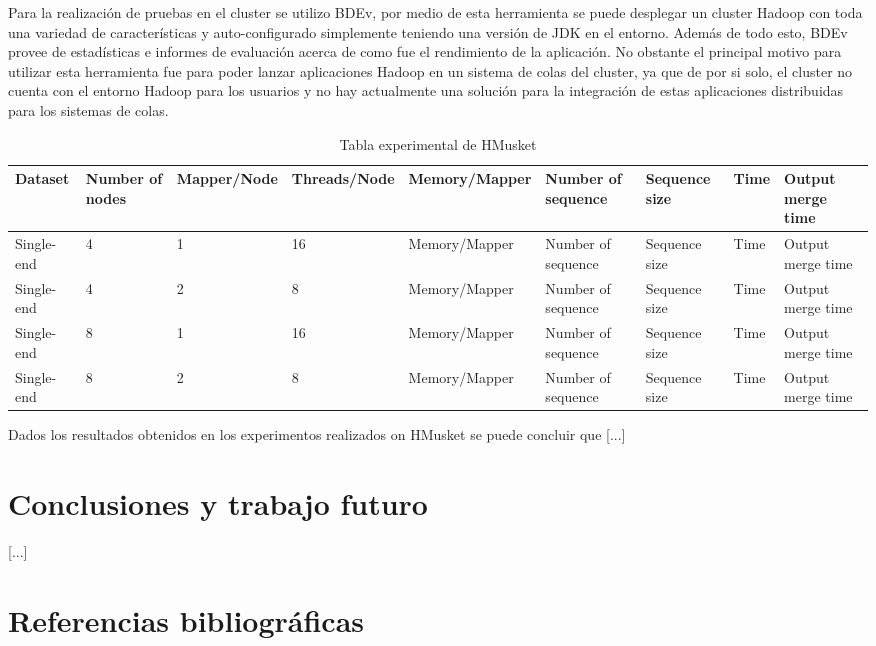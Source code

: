 \documentclass[conference]{IEEEtran}
\begin{document}
Para la realización de pruebas en el cluster se utilizo BDEv, por medio de esta herramienta se puede desplegar un cluster Hadoop con toda una variedad de características y auto-configurado simplemente teniendo una versión de JDK en el entorno. Además de todo esto, BDEv provee de estadísticas e informes de evaluación acerca de como fue el rendimiento de la aplicación. No obstante el principal motivo para utilizar esta herramienta fue para poder lanzar aplicaciones Hadoop en un sistema de colas del cluster, ya que de por si solo, el cluster no cuenta con el entorno Hadoop para los usuarios y no hay actualmente una solución para la integración de estas aplicaciones distribuidas para los sistemas de colas.\\

\begin{table}[]
	\centering
	\caption{Tabla experimental de HMusket}
	\label{tabla 1}
	\begin{tabular}{|l|l|l|l|l|l|l|l|l|}
		\hline
		\textbf{Dataset} &	\textbf{Number of nodes} & \textbf{Mapper/Node} & \textbf{Threads/Node} & \textbf{Memory/Mapper} & \textbf{Number of sequenc}e & \textbf{Sequence size} & \textbf{Time} & \textbf{Output merge time}	\\ \hline
		Single-end &	4 & 1 & 16 & Memory/Mapper & Number of sequence & Sequence size & Time	& Output merge time	\\ \hline
		Single-end &	4 & 2 & 8 & Memory/Mapper & Number of sequence & Sequence size & Time	& Output merge time	\\ \hline
		Single-end &	8 & 1 & 16 & Memory/Mapper & Number of sequence & Sequence size & Time	& Output merge time	\\ \hline
		Single-end &	8 & 2 & 8 & Memory/Mapper & Number of sequence & Sequence size & Time	& Output merge time	\\ \hline
	\end{tabular}
\end{table}

Dados los resultados obtenidos en los experimentos realizados on HMusket se puede concluir que [...]

\section{Conclusiones y trabajo futuro}
[...]

\section*{Referencias bibliográficas}
\end{document}

